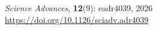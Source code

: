 \textit{Science Advances},
\textbf{12}(9): eadr4039,
2026
\\
\href{https://doi.org/10.1126/sciadv.adr4039}{https://doi.org/10.1126/sciadv.adr4039}

